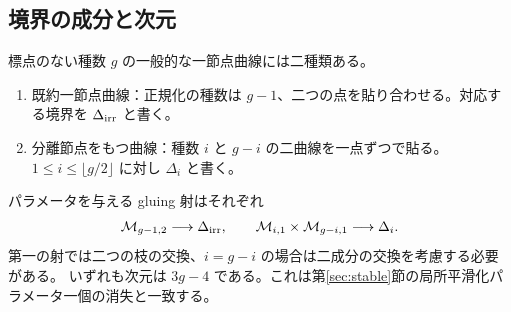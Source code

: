 \documentclass[dvipdfmx,a4paper,11pt]{article}
\theoremstyle{definition}
\begin{document}
\subsection{境界の成分と次元}
標点のない種数 $g$ の一般的な一節点曲線には二種類ある。
\begin{enumerate}
\item 既約一節点曲線：正規化の種数は $g-1$、二つの点を貼り合わせる。対応する境界を $\Delta_{\rm irr}$ と書く。
\item 分離節点をもつ曲線：種数 $i$ と $g-i$ の二曲線を一点ずつで貼る。$1\le i\le\lfloor g/2\rfloor$ に対し $\Delta_i$ と書く。
\end{enumerate}
パラメータを与える gluing 射はそれぞれ
\[
\mathcal M_{g-1,2}\longrightarrow\Delta_{\rm irr},\qquad
\mathcal M_{i,1}\times\mathcal M_{g-i,1}\longrightarrow\Delta_i.
\]
第一の射では二つの枝の交換、$i=g-i$ の場合は二成分の交換を考慮する必要がある。
いずれも次元は $3g-4$ である。これは第\ref{sec:stable}節の局所平滑化パラメータ一個の消失と一致する。
\end{document}
